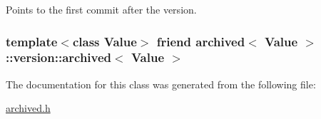 Points to the first commit after the version. 

\hypertarget{classarchived_1_1version_a0dcd43fda1e30a8d63bdfc22624fd185}{}
\subsubsection[{archived$<$ Value $>$}]{\setlength{\rightskip}{0pt plus 5cm}template$<$class Value$>$ friend {\bf archived}$<$ Value $>$\+::version\+::archived$<$ Value $>$\hspace{0.3cm}{\ttfamily [private]}}\label{classarchived_1_1version_a0dcd43fda1e30a8d63bdfc22624fd185}


The documentation for this class was generated from the following file\+:\begin{DoxyCompactItemize}
\item 
\hyperlink{archived_8h}{archived.\+h}\end{DoxyCompactItemize}

